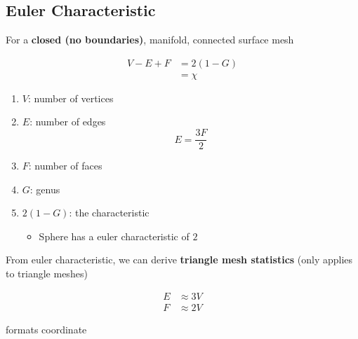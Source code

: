   \subsection{Euler Characteristic}

    For a \textbf{closed (no boundaries)}, manifold, connected surface mesh

    \begin{align}
      V - E + F &= 2 \left( 1 - G \right) \\
      &= \chi
    \end{align}

    \begin{enumerate}
      \item $ V $: number of vertices
      \item $ E $: number of edges
      \begin{equation}
        E = \frac{3F}{2}
      \end{equation}

      \item $ F $: number of faces
      \item $ G $: genus
      \item $ 2 \left( 1 - G \right) $: the characteristic
      \begin{itemize}
        \item Sphere has a euler characteristic of $ 2 $
      \end{itemize}
    \end{enumerate}

    From euler characteristic, we can derive \textbf{triangle mesh statistics}
    (only applies to triangle meshes)

    \begin{align}
      E &\approx 3V \\
      F &\approx 2V
    \end{align}

{formats}
{coordinate}
